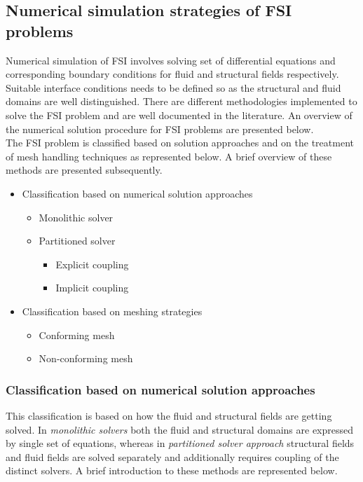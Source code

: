 \subsection{Numerical simulation strategies of FSI problems}
Numerical simulation of FSI involves solving set of differential equations and corresponding boundary conditions for fluid and structural fields respectively. Suitable interface conditions needs to be defined so as the structural and fluid domains are well distinguished. There are different methodologies implemented to solve the FSI problem and are well documented in the literature. An overview of the numerical solution procedure for FSI problems are presented below.\\
The FSI problem is classified based on solution approaches and on the treatment of mesh handling techniques as represented below. A brief overview of these methods are presented subsequently.

\begin{itemize}
 \item{Classification based on numerical solution approaches}
 \begin{itemize}
 \item{Monolithic solver}
 \item{Partitioned solver}
 \begin{itemize}
 \item{Explicit coupling}
 \item{Implicit coupling}
 \end{itemize}
 \end{itemize}
 \item{Classification based on meshing strategies}
 \begin{itemize}
 \item{Conforming mesh}
 \item{Non-conforming mesh}
 \end{itemize}
\end{itemize} 

\subsubsection{Classification based on numerical solution approaches}
This classification is based on how the fluid and structural fields are getting solved. In \textit{monolithic solvers} both the fluid and structural domains are expressed by single set of equations, whereas in \textit{partitioned solver approach} structural fields and fluid fields are solved separately and additionally requires coupling of the distinct solvers. A brief introduction to these methods are represented below.    

